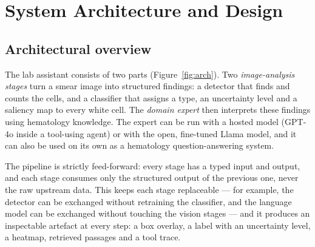 \section{System Architecture and Design}\label{sec:arch}

\subsection{Architectural overview}

The lab assistant consists of two parts (Figure~\ref{fig:arch}). Two \emph{image-analysis stages} turn a smear image into structured findings: a detector that finds and counts the cells, and a classifier that assigns a type, an uncertainty level and a saliency map to every white cell. The \emph{domain expert} then interprets these findings using hematology knowledge. The expert can be run with a hosted model (GPT-4o inside a tool-using agent) or with the open, fine-tuned Llama model, and it can also be used on its own as a hematology question-answering system.

The pipeline is strictly feed-forward: every stage has a typed input and output, and each stage consumes only the structured output of the previous one, never the raw upstream data. This keeps each stage replaceable --- for example, the detector can be exchanged without retraining the classifier, and the language model can be exchanged without touching the vision stages --- and it produces an inspectable artefact at every step: a box overlay, a label with an uncertainty level, a heatmap, retrieved passages and a tool trace.

